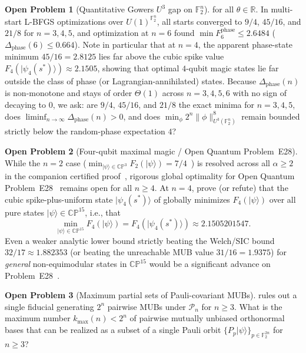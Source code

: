 \documentclass[11pt,a4paper]{article}
\theoremstyle{plain}
\theoremstyle{definition}
\newtheorem{openproblem}{Open Problem}
\theoremstyle{remark}
\newcommand{\R}{\mathbb{R}}
\newcommand{\F}{\mathbb{F}}
\newcommand{\CP}{\mathbb{CP}}
\newcommand{\Pauli}{\mathcal{P}}
\newcommand{\Uone}{U(1)}
\newcommand{\ket}[1]{|#1\rangle}
\newcommand{\norm}[1]{\lVert#1\rVert}
\numberwithin{equation}{section}
\begin{document}
\begin{openproblem}[Quantitative Gowers $U^3$ gap on $\F_2^n$]
for all $\theta \in \R$. In multi-start L-BFGS optimizations over $\Uone^{\F_2^n}$, all starts converged to $9/4$, $45/16$, and $21/8$ for $n = 3, 4, 5$, and optimization at $n = 6$ found $\min F_6^{\mathrm{phase}} \le 2.6484$ ($\Delta_{\mathrm{phase}}(6) \le 0.664$). Note in particular that at $n = 4$, the apparent phase-state minimum $45/16 = 2.8125$ lies far above the cubic spike value $F_4(\ket{\psi_4(s^*)}) \approx 2.1505$, showing that optimal $4$-qubit magic states lie far outside the class of phase (or Lagrangian-annihilated) states. Because $\Delta_{\mathrm{phase}}(n)$ is non-monotone and stays of order $\Theta(1)$ across $n = 3, 4, 5, 6$ with no sign of decaying to $0$, we ask: are $9/4$, $45/16$, and $21/8$ the exact minima for $n = 3, 4, 5$, does $\liminf_{n\to\infty} \Delta_{\mathrm{phase}}(n) > 0$, and does $\min_\phi 2^n\norm{\phi}_{U^3(\F_2^n)}^8$ remain bounded strictly below the random-phase expectation $4$?
\end{openproblem}

\begin{openproblem}[Four-qubit maximal magic / Open Quantum Problem~E28]\label{op:e28-4qubit}
While the $n = 2$ case ($\min_{\ket{\psi}\in\CP^3} F_2(\ket{\psi}) = 7/4$~\cite{liu2026maximal}) is resolved across all $\alpha \ge 2$ in the companion certified proof~\cite{ye2026twoqubit}, rigorous global optimality for Open Quantum Problem~E28~\cite{oqpE28} remains open for all $n \ge 4$. At $n = 4$, prove (or refute) that the cubic spike-plus-uniform state $\ket{\psi_4(s^*)}$ of  globally minimizes $F_4(\ket{\psi})$ over all pure states $\ket{\psi} \in \CP^{15}$, i.e., that
\[
  \min_{\ket{\psi} \in \CP^{15}} F_4(\ket{\psi}) = F_4(\ket{\psi_4(s^*)}) \approx 2.1505201547.
\]
Even a weaker analytic lower bound strictly beating the Welch/SIC bound $32/17 \approx 1.882353$ (or beating the unreachable MUB value $31/16 = 1.9375$) for \emph{general} non-equimodular states in $\CP^{15}$ would be a significant advance on Problem~E28~\cite{oqpE28}.
\end{openproblem}

\begin{openproblem}[Maximum partial sets of Pauli-covariant MUBs]\label{op:partial-mub}
 rules out a single fiducial generating $2^n$ pairwise MUBs under $\Pauli_n$ for $n \ge 3$. What is the maximum number $k_{\max}(n) < 2^n$ of pairwise mutually unbiased orthonormal bases that can be realized as a subset of a single Pauli orbit $\{P_p\ket{\psi}\}_{p \in \F_2^{2n}}$ for $n \ge 3$?
\end{openproblem}
\end{document}
